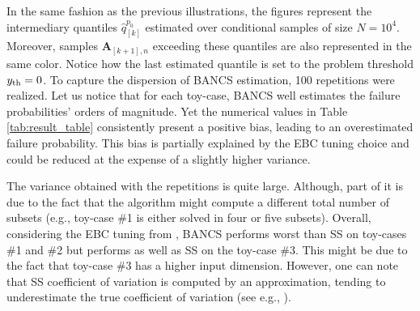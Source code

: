 In the same fashion as the previous illustrations, the figures represent the intermediary quantiles $\widehat{q}_{[k]}^{p_0}$ estimated over conditional samples of size $N=10^4$. 
Moreover, samples $\mathbf{A}_{[k+1], n}$ exceeding these quantiles are also represented in the same color. 
Notice how the last estimated quantile is set to the problem threshold $y_\mathrm{th} = 0$. 
To capture the dispersion of BANCS estimation, 100 repetitions were realized. 
Let us notice that for each toy-case, BANCS well estimates the failure probabilities' orders of magnitude. 
Yet the numerical values in Table \ref{tab:result_table} consistently present a positive bias, leading to an overestimated failure probability. 
This bias is partially explained by the EBC tuning choice and could be reduced at the expense of a slightly higher variance.

The variance obtained with the repetitions is quite large. 
Although, part of it is due to the fact that the algorithm might compute a different total number of subsets (e.g., toy-case \#1 is either solved in four or five subsets). 
Overall, considering the EBC tuning from , BANCS performs worst than SS on toy-cases \#1 and \#2 but performs as well as SS on the toy-case \#3. 
This might be due to the fact that toy-case \#3 has a higher input dimension. 
However, one can note that SS coefficient of variation is computed by an approximation, tending to underestimate the true coefficient of variation (see e.g., \cite{Papaioannou_PEM_2015}). 

